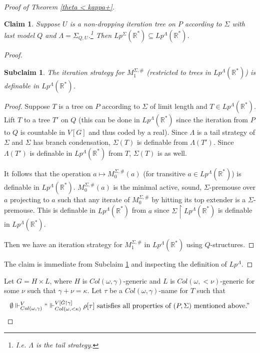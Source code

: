 \documentclass[12pt]{article}
\newtheorem{claim}[theorem]{Claim}
\newtheorem{subclaim}[theorem]{Subclaim}
\newcommand\R{\mathbb{R}}
\begin{document}
\begin{proof}[Proof of Theorem \ref{theta < kappa+}]
    \begin{claim}
    \label{getting sigma from lambda}
        Suppose $U$ is a non-dropping iteration tree on $P$ according to $\Sigma$ with last model $Q$ and $\Lambda = \Sigma_{Q,U}$.\footnote{I.e. $\Lambda$ is the tail strategy.} Then $Lp^{\Sigma}(\R^*) \subseteq Lp^{\Lambda}(\R^*)$.
    \end{claim}
    \begin{proof}
        \begin{subclaim}
        \label{strategy for M1Sigma}
            The iteration strategy for $M_1^{\Sigma,\#}$ (restricted to trees in $Lp^{\Lambda}(\R^*)$) is definable in $Lp^{\Lambda}(\R^*)$.
        \end{subclaim}
        \begin{proof}
            Suppose $T$ is a tree on $P$ according to $\Sigma$ of limit length and $T\in Lp^{\Lambda}(\R^*)$. Lift $T$ to a tree $T'$ on $Q$ (this can be done in $Lp^{\Lambda}(\R^*)$ since the iteration from $P$ to $Q$ is countable in $V[G]$ and thus coded by a real). Since $\Lambda$ is a tail strategy of $\Sigma$ and $\Sigma$ has branch condensation, $\Sigma(T)$ is definable from $\Lambda(T')$. Since $\Lambda(T')$ is definable in $Lp^{\Lambda}(\R^*)$ from $T$, $\Sigma(T)$ is as well.

            It follows that the operation $a \mapsto M_0^{\Sigma,\#}(a)$ (for transitive $a\in Lp^{\Lambda}(\R^*)$) is definable in $Lp^{\Lambda}(\R^*)$. $M_0^{\Sigma,\#}(a)$ is the minimal active, sound, $\Sigma$-premouse over $a$ projecting to $a$ such that any iterate of $M_0^{\Sigma,\#}$ by hitting its top extender is a $\Sigma$-premouse. This is definable in $Lp^{\Lambda}(\R^*)$ from $a$ since $\Sigma\upharpoonright Lp^{\Lambda}(\R^*)$ is definable in $Lp^{\Lambda}(\R^*)$.

            Then we have an iteration strategy for $M_1^{\Sigma,\#}$ in $Lp^{\Lambda}(\R^*)$ using $Q$-structures.
        \end{proof}

        The claim is immediate from Subclaim \ref{strategy for M1Sigma} and inspecting the definition of $Lp^{\Lambda}$.
    \end{proof}

    Let $G = H \times L$, where $H$ is $Col(\omega,\gamma)$-generic and $L$ is $Col(\omega,<\nu)$-generic for some $\nu$ such that $\gamma + \nu = \kappa$. Let $\tau$ be a $Col(\omega,\gamma)$-name for $T$ such that
    \begin{equation*}
        \emptyset \Vdash^V_{Col(\omega,\gamma)}``\Vdash^{V[\dot{G}\upharpoonright\gamma]}_{Col(\omega,<\kappa)} \rho[\tau] \text{ satisfies all properties of } (P,\Sigma) \text{ mentioned above.''}
    \end{equation*}


\end{proof}
\end{document}
